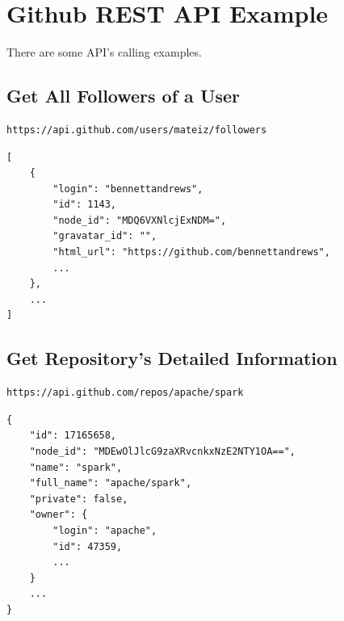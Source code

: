 \appendices

\section{Github REST API Example}
\label{a-ghrest}

There are some API's calling examples.


\subsection{Get All Followers of a User}

\begin{verbatim}
https://api.github.com/users/mateiz/followers
\end{verbatim}


\begin{verbatim}
[
    {
        "login": "bennettandrews",
        "id": 1143,
        "node_id": "MDQ6VXNlcjExNDM=",
        "gravatar_id": "",
        "html_url": "https://github.com/bennettandrews",
        ...
    },
    ...
]
\end{verbatim}


\subsection{Get Repository's Detailed Information}

\begin{verbatim}
https://api.github.com/repos/apache/spark
\end{verbatim}


\begin{verbatim}
{
    "id": 17165658,
    "node_id": "MDEwOlJlcG9zaXRvcnkxNzE2NTY1OA==",
    "name": "spark",
    "full_name": "apache/spark",
    "private": false,
    "owner": {
        "login": "apache",
        "id": 47359,
        ...
    }
    ...
}
\end{verbatim}



